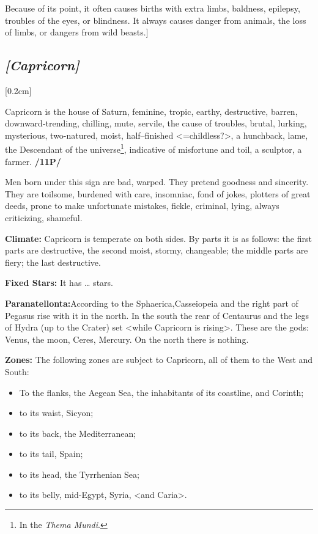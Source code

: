 Because of its point, it often causes births with extra limbs, baldness, epilepsy, troubles of the eyes, or blindness. It always causes danger from animals, the loss of limbs, or dangers from wild beasts.]

\secbr
\subsection{\textit{[Capricorn]}}
[0.2cm]

 Capricorn is the house of Saturn,  feminine,  tropic,  earthy, destructive,  barren, downward-trending, chilling,  mute,  servile, the cause of troubles, brutal, lurking, mysterious, two-natured, moist, half–finished <=childless?>, a hunchback, lame, the Descendant of the universe\footnote{In the \textit{Thema Mundi}.}, indicative of misfortune and toil, a sculptor, a farmer. \textbf{/11P/ }

Men born under this sign are bad, warped. They pretend goodness and sincerity. They are toilsome, burdened with care, insomniac, fond of jokes, plotters of great deeds, prone to make unfortunate mistakes, fickle, criminal, lying, always criticizing, shameful.

\textbf{Climate:} Capricorn is temperate on both sides. By parts it is as follows: the first parts are destructive, the
second moist, stormy, changeable; the middle parts are fiery; the last destructive. 

\textbf{Fixed Stars:} It has … stars.

\textbf{Paranatellonta:}According to the Sphaerica,Casseiopeia and the right part of Pegasus rise with it in the north. In the south the rear of Centaurus and the legs of Hydra (up to the Crater) set <while Capricorn is rising>. These are the gods: Venus, the moon, Ceres, Mercury. On the north there is nothing.

\textbf{Zones:} The following zones are subject to Capricorn, all of them to the West and South: 
\begin{itemize}
\item To the flanks, the Aegean Sea, the inhabitants of its coastline, and Corinth; 
\item to its waist, Sicyon; 
\item to its back, the Mediterranean; 
\item to its tail, Spain; 
\item to its head, the Tyrrhenian Sea; 
\item to its belly, mid-Egypt, Syria, <and Caria>.
\end{itemize}

